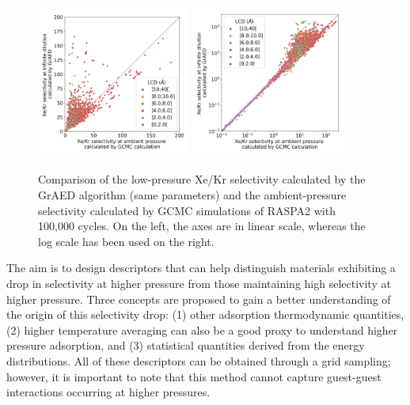 \documentclass[main]{subfiles}
\begin{document}
\begin{figure}[ht]
  \centering
    \includegraphics[width=0.45\textwidth]{figures/3-fastsim/s_2080_vs_s_0_grid_overview.jpg}
    \hfill
    \includegraphics[width=0.45\textwidth]{figures/3-fastsim/s_2080_vs_s_0_grid_overview_log.jpg}
    \caption{Comparison of the low-pressure Xe/Kr selectivity calculated by the GrAED algorithm (same parameters) and the ambient-pressure selectivity calculated by GCMC simulations of RASPA2 with 100,000 cycles. On the left, the axes are in linear scale, whereas the log scale has been used on the right. }\label{fgr:grid_ambient_selectivity}
\end{figure}

The aim is to design descriptors that can help distinguish materials exhibiting a drop in selectivity at higher pressure from those maintaining high selectivity at higher pressure. Three concepts are proposed to gain a better understanding of the origin of this selectivity drop: (1) other adsorption thermodynamic quantities, (2) higher temperature averaging can also be a good proxy to understand higher pressure adsorption, and (3) statistical quantities derived from the energy distributions. All of these descriptors can be obtained through a grid sampling; however, it is important to note that this method cannot capture guest-guest interactions occurring at higher pressures.
\end{document}
